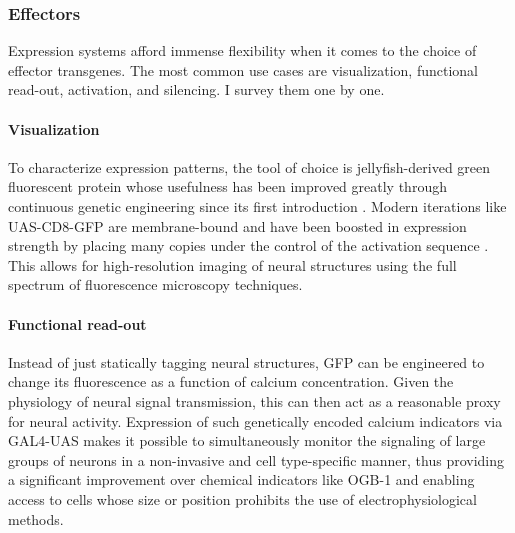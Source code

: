 \subsubsection{Effectors}
Expression systems afford immense flexibility when it comes to the choice of effector transgenes. The most common use cases are visualization, functional read-out, activation, and silencing. I survey them one by one.

\paragraph{Visualization} To characterize expression patterns, the tool of choice is jellyfish-derived green fluorescent protein \citep[GFP;][]{Chalfie:1994aa} whose usefulness has been improved greatly through continuous genetic engineering since its first introduction \citep[see for instance][]{Heim:1995aa}. Modern iterations like UAS-CD8-GFP are membrane-bound and have been boosted in expression strength by placing many copies under the control of the activation sequence \citep{Pfeiffer:2010aa}. This allows for high-resolution imaging of neural structures using the full spectrum of fluorescence microscopy techniques.

\paragraph{Functional read-out} Instead of just statically tagging neural structures, GFP can be engineered to change its fluorescence as a function of calcium concentration. Given the physiology of neural signal transmission, this can then act as a reasonable proxy for neural activity. Expression of such genetically encoded calcium indicators via GAL4-UAS makes it possible to simultaneously monitor the signaling of large groups of neurons in a non-invasive and cell type-specific manner, thus providing a significant improvement over chemical indicators like OGB-1 \citep{Hendel:2008fp} and enabling access to cells whose size or position prohibits the use of electrophysiological methods.


